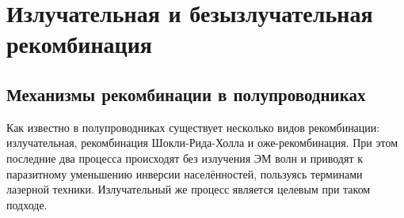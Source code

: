 \documentclass[../main.tex]{subfiles}
\begin{document}
    \chapter{Излучательная и безызлучательная рекомбинация}
    \section{Механизмы рекомбинации в полупроводниках}
    Как известно в полупроводниках существует несколько видов рекомбинации:
    излучательная, рекомбинация Шокли-Рида-Холла и оже-рекомбинация. 
    При этом последние два процесса происходят без излучения ЭМ волн и приводят
    к паразитному уменьшению инверсии населённостей, пользуясь терминами 
    лазерной техники. Излучательный же процесс является целевым при таком подходе.
    \vspace{0.5cm}
\end{document}
